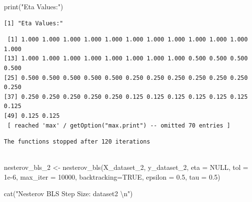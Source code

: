 \documentclass[
  letterpaper,
  DIV=11,
  numbers=noendperiod]{scrartcl}
\newenvironment{Shaded}{\begin{snugshade}}{\end{snugshade}}
\newcommand{\AttributeTok}[1]{\textcolor[rgb]{0.40,0.45,0.13}{#1}}
\newcommand{\ConstantTok}[1]{\textcolor[rgb]{0.56,0.35,0.01}{#1}}
\newcommand{\DecValTok}[1]{\textcolor[rgb]{0.68,0.00,0.00}{#1}}
\newcommand{\FloatTok}[1]{\textcolor[rgb]{0.68,0.00,0.00}{#1}}
\newcommand{\FunctionTok}[1]{\textcolor[rgb]{0.28,0.35,0.67}{#1}}
\newcommand{\NormalTok}[1]{\textcolor[rgb]{0.00,0.23,0.31}{#1}}
\newcommand{\OtherTok}[1]{\textcolor[rgb]{0.00,0.23,0.31}{#1}}
\newcommand{\SpecialCharTok}[1]{\textcolor[rgb]{0.37,0.37,0.37}{#1}}
\newcommand{\StringTok}[1]{\textcolor[rgb]{0.13,0.47,0.30}{#1}}
\begin{document}
\begin{Shaded}
\begin{Highlighting}[]
\FunctionTok{print}\NormalTok{(}\StringTok{"Eta Values:"}\NormalTok{)}
\end{Highlighting}
\end{Shaded}

\begin{verbatim}
[1] "Eta Values:"
\end{verbatim}

\begin{Shaded}
\end{Shaded}

\begin{verbatim}
 [1] 1.000 1.000 1.000 1.000 1.000 1.000 1.000 1.000 1.000 1.000 1.000 1.000
[13] 1.000 1.000 1.000 1.000 1.000 1.000 1.000 1.000 0.500 0.500 0.500 0.500
[25] 0.500 0.500 0.500 0.500 0.500 0.250 0.250 0.250 0.250 0.250 0.250 0.250
[37] 0.250 0.250 0.250 0.250 0.250 0.125 0.125 0.125 0.125 0.125 0.125 0.125
[49] 0.125 0.125
 [ reached 'max' / getOption("max.print") -- omitted 70 entries ]
\end{verbatim}

\begin{Shaded}
\end{Shaded}

\begin{verbatim}
The functions stopped after 120 iterations 
 
\end{verbatim}

\begin{Shaded}
\begin{Highlighting}[]
\NormalTok{nesterov\_bls\_2 }\OtherTok{\textless{}{-}} \FunctionTok{nesterov\_bls}\NormalTok{(X\_dataset\_2, y\_dataset\_2, }\AttributeTok{eta =} \ConstantTok{NULL}\NormalTok{, }\AttributeTok{tol =} \FloatTok{1e{-}6}\NormalTok{, }\AttributeTok{max\_iter =} \DecValTok{10000}\NormalTok{, }\AttributeTok{backtracking=}\ConstantTok{TRUE}\NormalTok{, }\AttributeTok{epsilon =} \FloatTok{0.5}\NormalTok{, }\AttributeTok{tau =} \FloatTok{0.5}\NormalTok{)}

\FunctionTok{cat}\NormalTok{(}\StringTok{"Nesterov BLS Step Size: dataset2 }\SpecialCharTok{\textbackslash{}n}\StringTok{"}\NormalTok{)}
\end{Highlighting}
\end{Shaded}
\end{document}
